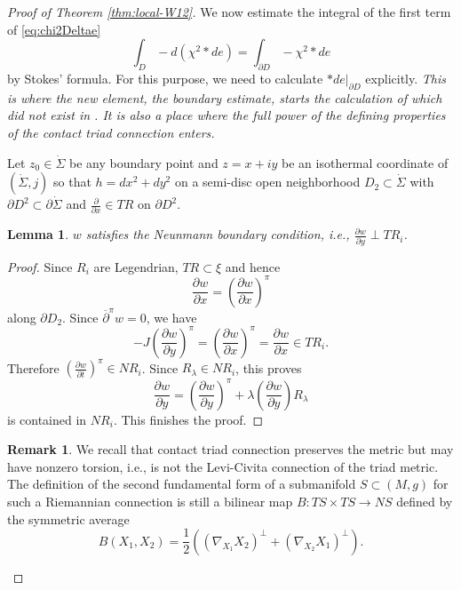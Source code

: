 \documentclass[reqno]{amsart}
\newcommand{\del}{\partial}
\newcommand{\be}{\begin{equation}}
\newcommand{\ee}{\end{equation}}
\theoremstyle{theorem}
\newtheorem{lem}[thm]{Lemma}
\theoremstyle{definition}
\newtheorem{rem}[thm]{Remark}
\numberwithin{equation}{section}
\def\delbar{{\overline \partial}}
\def\delbar{{\overline \partial}}
\begin{document}
\begin{proof} [Proof of Theorem \ref{thm:local-W12}]
We now estimate the integral of the first term of \eqref{eq:chi2Deltae}
\be\label{eq:first-term}
\int_D -d(\chi^2 * de) = \int_{\del D} - \chi^2 *de
\ee
by Stokes' formula. For this purpose, we need to calculate $*de|_{\del D}$ explicitly.
\emph{This is where the new element, the boundary estimate, starts the
calculation of which did not exist in \cite{oh-wang:CR-map1}. It is also a place where the full
power of the defining properties of the contact triad connection enters.}

Let $z_0 \in \dot \Sigma$ be any boundary point and $z = x+iy$ be
an isothermal coordinate of $(\dot \Sigma, j)$ so that $h = dx^2 + dy^2$
on a semi-disc open neighborhood $D_2 \subset \dot \Sigma$ with $\del D^2 \subset \del \dot \Sigma$
and $\frac{\del}{\del x} \in TR$ on $\del D^2$.

\begin{lem}\label{lem:Neunman-bdy} $w$ satisfies the Neunmann boundary condition,
i.e., $\frac{\del w}{\del y} \perp TR_i$.
\end{lem}
\begin{proof} Since $R_i$ are Legendrian, $TR \subset \xi$ and hence
$$
\frac{\del w}{\del x} = \left(\frac{\del w}{\del x}\right)^\pi
$$
along $\del D_2$.
Since $\delbar^\pi w= 0$, we have
$$
- J\left(\frac{\del w}{\del y}\right)^\pi
= \left(\frac{\del w}{\del x}\right)^\pi = \frac{\del w}{\del x} \in TR_i.
$$
Therefore $\left(\frac{\del w}{\del t}\right)^\pi \in NR_i$. Since $R_\lambda \in NR_i$,
this proves
$$
\frac{\del w}{\del y} = \left(\frac{\del w}{\del y}\right)^\pi
+ \lambda\left(\frac{\del w}{\del y} \right) R_\lambda
$$
is contained in $NR_i$. This finishes the proof.
\end{proof}

\begin{rem}
We recall that contact triad connection preserves the metric but may have
nonzero torsion, i.e., is not the Levi-Civita connection of the triad metric.
The definition of the second fundamental form of a submanifold $S \subset (M,g)$ for
such a Riemannian connection is still a bilinear map
$
B: TS \times TS \to NS
$
defined by the symmetric average
\be\label{eq:B}
B(X_1,X_2) = \frac12((\nabla_{X_1} X_2)^\perp + (\nabla_{X_2}X_1)^\perp).
\ee
\end{rem}


\end{proof}
\end{document}
